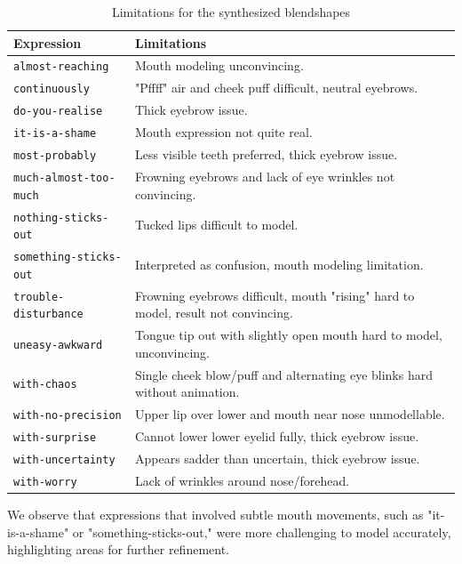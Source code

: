 \documentclass[../../main]{subfiles}
\begin{document}
\begin{table}[h]
    \centering
    \begin{tabular}{|l|p{8cm}|}
    \hline
    \textbf{Expression} & \textbf{Limitations} \\
    \hline
    \texttt{almost-reaching} & Mouth modeling unconvincing. \\
    \hline
    \texttt{continuously} & "Pffff" air and cheek puff difficult, neutral eyebrows. \\
    \hline
    \texttt{do-you-realise} & Thick eyebrow issue. \\
    \hline
    \texttt{it-is-a-shame} & Mouth expression not quite real. \\
    \hline
    \texttt{most-probably} & Less visible teeth preferred, thick eyebrow issue. \\
    \hline
    \texttt{much-almost-too-much} & Frowning eyebrows and lack of eye wrinkles not convincing. \\
    \hline
    \texttt{nothing-sticks-out} & Tucked lips difficult to model. \\
    \hline
   \texttt{something-sticks-out} & Interpreted as confusion, mouth modeling limitation. \\
    \hline
    \texttt{trouble-disturbance} & Frowning eyebrows difficult, mouth "rising" hard to model, result not convincing. \\
    \hline
    \texttt{uneasy-awkward} & Tongue tip out with slightly open mouth hard to model, unconvincing. \\
    \hline
    \texttt{with-chaos} & Single cheek blow/puff and alternating eye blinks hard without animation. \\
    \hline
    \texttt{with-no-precision} & Upper lip over lower and mouth near nose unmodellable. \\
    \hline
    \texttt{with-surprise} & Cannot lower lower eyelid fully, thick eyebrow issue. \\
    \hline
    \texttt{with-uncertainty} & Appears sadder than uncertain, thick eyebrow issue. \\
    \hline
    \texttt{with-worry} & Lack of wrinkles around nose/forehead. \\
    \hline
    \end{tabular}
    \caption{Limitations for the synthesized blendshapes}
    \label{tab:facial_expressions_evaluation}
\end{table}

We observe that expressions that involved subtle mouth movements, such as "it-is-a-shame" or "something-sticks-out," were more challenging to model accurately, highlighting areas for further refinement.
\end{document}

